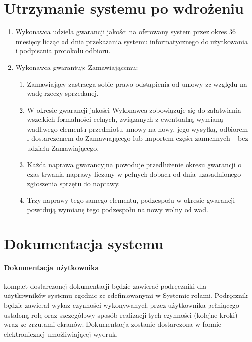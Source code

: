 \documentclass{article}
\begin{document}
\section{Utrzymanie systemu po wdrożeniu}
\begin{enumerate}
\item Wykonawca udziela gwarancji jakości na oferowany system przez okres 36 miesięcy licząc od dnia przekazania systemu informatycznego do użytkowania i podpisania protokołu  odbioru. 
\item Wykonawca  gwarantuje Zamawiającemu:
\begin{enumerate}
\item Zamawiający zastrzega sobie prawo odstąpienia od umowy ze względu na wadę rzeczy sprzedanej.
\item W okresie gwarancji jakości Wykonawca zobowiązuje się do załatwiania wszelkich formalności celnych, związanych z ewentualną wymianą wadliwego elementu przedmiotu umowy na nowy, jego wysyłką, odbiorem i dostarczeniem do Zamawiającego lub importem części zamiennych – bez udziału Zamawiającego.
\item Każda naprawa gwarancyjna powoduje przedłużenie okresu gwarancji o czas trwania naprawy liczony w pełnych dobach od dnia uzasadnionego zgłoszenia sprzętu do naprawy.
\item Trzy naprawy tego samego elementu, podzespołu w okresie gwarancji powodują wymianę tego podzespołu na nowy wolny od wad.
\end{enumerate}
\end{enumerate}

\section{Dokumentacja systemu}
\paragraph{Dokumentacja użytkownika} komplet dostarczonej dokumentacji będzie zawierać podręczniki dla użytkowników systemu zgodnie ze zdefiniowanymi w Systemie rolami. Podręcznik będzie zawierał wykaz czynności wykonywanych przez użytkownika pełniącego ustaloną rolę oraz szczegółowy sposób realizacji tych czynności (kolejne kroki) wraz ze zrzutami ekranów. Dokumentacja zostanie dostarczona w formie elektronicznej umożliwiającej wydruk.
\end{document}
